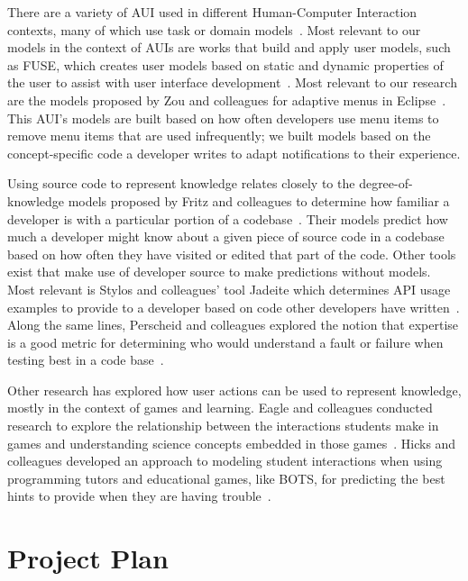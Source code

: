 \documentclass{llncs}
\begin{document}
There are a variety of AUI used in different Human-Computer Interaction contexts, many of which use task or domain models~\cite{schlungbaum1996model}. Most relevant to our models in the context of AUIs are works that build and apply user models, such as FUSE, which creates user models based on static and dynamic properties of the user to assist with user interface development~\cite{lonczewski1996fuse}. Most relevant to our research are the models proposed by Zou and colleagues for adaptive menus in Eclipse~\cite{zou2008adapting}.
This AUI's models are built based on how often developers use menu items to remove menu items that are used infrequently; we built models based on the concept-specific code a developer writes to adapt notifications to their experience.


Using source code to represent knowledge relates closely to the degree-of-knowledge models proposed by Fritz and colleagues to determine how familiar a developer is with a particular portion of a codebase~\cite{fritz2010degree}. Their models predict how much a developer might know about a given piece of source code in a codebase based on how often they have visited or edited that part of the code.
Other tools exist that make use of developer source to make predictions without models. Most relevant is Stylos and colleagues' tool Jadeite which determines API usage examples to provide to a developer based on code other developers have written~\cite{stylos2009improving}.
Along the same lines, Perscheid and colleagues explored the notion that expertise is a good metric for determining who would understand a fault or failure when testing best in a code base~\cite{perscheid2012test}.

Other research has explored how user actions can be used to represent knowledge, mostly in the context of games and learning. Eagle and colleagues conducted research to explore the relationship between the interactions students make in games and understanding science concepts embedded in those games~\cite{eagle2015measuring}. Hicks and colleagues developed an approach to modeling student interactions when using programming tutors and educational games, like BOTS, for predicting the best hints to provide when they are having trouble~\cite{hicks2014building}.



\section{Project Plan}
\end{document}
